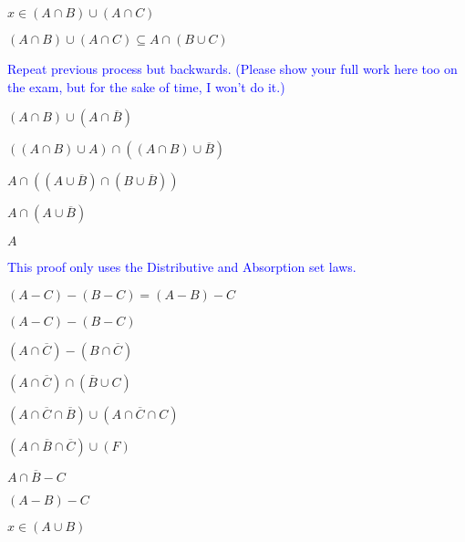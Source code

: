 \documentclass{exam}
\begin{document}
\begin{questions}
\begin{subparts}
\begin{center}
\( x \in (A \cap B) \cup (A \cap C)\)

\vspace{5mm}

\( (A \cap B) \cup (A \cap C) \subseteq  A \cap (B \cup C) \)

\textcolor{blue}{Repeat previous process but backwards. (Please show your full work here too on the exam, but for the sake of time, I won't do it.)}

\end{center}


\begin{center}

\( (A \cap B) \cup (A \cap \overline{B}) \)

\( ((A \cap B) \cup A) \cap ((A \cap B) \cup \overline{B}) \)

\( A \cap ((A \cup \overline{B}) \cap (B \cup \overline{B})) \)

\( A \cap (A \cup \overline{B})  \)

\( A \)

\textcolor{blue}{This proof only uses the Distributive and Absorption set laws.}

\end{center}


\begin{center}

\( (A - C) - (B - C) = (A - B) - C \)

\( (A - C) - (B - C) \)

\( (A \cap \overline{C}) - (B \cap \overline{C}) \)

\( (A \cap \overline{C}) \cap (\overline{B} \cup C) \)

\( (A \cap \overline{C} \cap \overline{B}) \cup (A \cap \overline{C} \cap C) \)

\( (A \cap \overline{B} \cap \overline{C}) \cup (F) \)

\( A \cap \overline{B} - C \)

\( (A - B) - C \)

\end{center}

\newpage


\begin{center}

\(x \in (A \cup B)\)


\end{center}
\end{subparts}
\end{questions}
\end{document}

